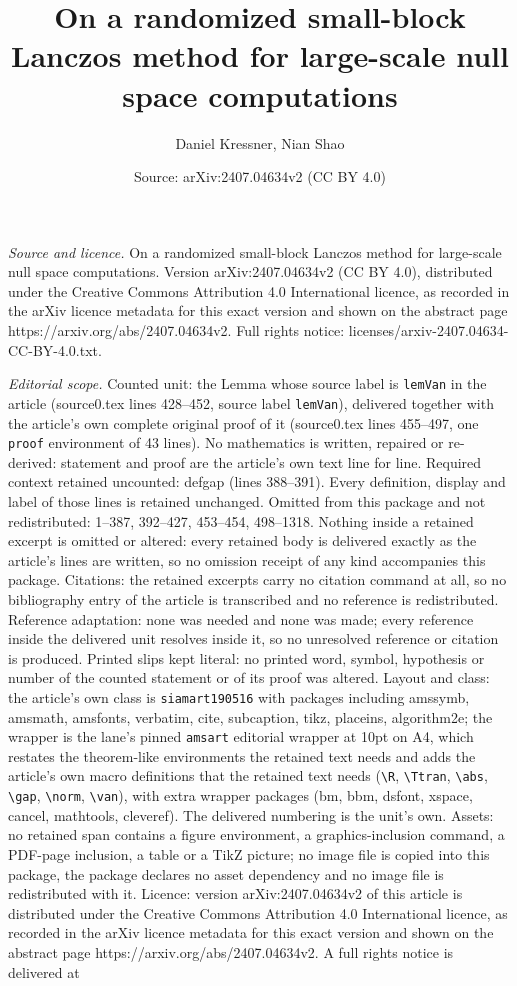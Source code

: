 \documentclass[10pt,a4paper]{amsart}
\title[On a randomized small-block Lanczos method for large-scale n]{On a randomized small-block Lanczos method for large-scale null space computations}
\author{Daniel Kressner, Nian Shao}
\date{Source: arXiv:2407.04634v2 (CC BY 4.0)}
\begin{document}
\maketitle

\noindent\emph{Source and licence.} On a randomized small-block Lanczos method for large-scale null space computations. Version arXiv:2407.04634v2 (CC BY 4.0), distributed under the Creative Commons Attribution 4.0 International licence, as recorded in the arXiv licence metadata for this exact version and shown on the abstract page https://arxiv.org/abs/2407.04634v2. Full rights notice: licenses/arxiv-2407.04634-CC-BY-4.0.txt.\par\smallskip

\noindent\textit{Editorial scope.} Counted unit: the Lemma whose source label is \texttt{lemVan} in the article (source0.tex lines 428--452, source label \texttt{lemVan}), delivered together with the article's own complete original proof of it (source0.tex lines 455--497, one \texttt{proof} environment of 43 lines). No mathematics is written, repaired or re-derived: statement and proof are the article's own text line for line. Required context retained uncounted: defgap (lines 388--391). Every definition, display and label of those lines is retained unchanged. Omitted from this package and not redistributed: 1--387, 392--427, 453--454, 498--1318. Nothing inside a retained excerpt is omitted or altered: every retained body is delivered exactly as the article's lines are written, so no omission receipt of any kind accompanies this package. Citations: the retained excerpts carry no citation command at all, so no bibliography entry of the article is transcribed and no reference is redistributed. Reference adaptation: none was needed and none was made; every reference inside the delivered unit resolves inside it, so no unresolved reference or citation is produced. Printed slips kept literal: no printed word, symbol, hypothesis or number of the counted statement or of its proof was altered. Layout and class: the article's own class is \texttt{siamart190516} with packages including amssymb, amsmath, amsfonts, verbatim, cite, subcaption, tikz, placeins, algorithm2e; the wrapper is the lane's pinned \texttt{amsart} editorial wrapper at 10pt on A4, which restates the theorem-like environments the retained text needs and adds the article's own macro definitions that the retained text needs (\texttt{\textbackslash R}, \texttt{\textbackslash Ttran}, \texttt{\textbackslash abs}, \texttt{\textbackslash gap}, \texttt{\textbackslash norm}, \texttt{\textbackslash van}), with extra wrapper packages (bm, bbm, dsfont, xspace, cancel, mathtools, cleveref). The delivered numbering is the unit's own. Assets: no retained span contains a figure environment, a graphics-inclusion command, a PDF-page inclusion, a table or a TikZ picture; no image file is copied into this package, the package declares no asset dependency and no image file is redistributed with it. Licence: version arXiv:2407.04634v2 of this article is distributed under the Creative Commons Attribution 4.0 International licence, as recorded in the arXiv licence metadata for this exact version and shown on the abstract page https://arxiv.org/abs/2407.04634v2. A full rights notice is delivered at 
\end{document}
